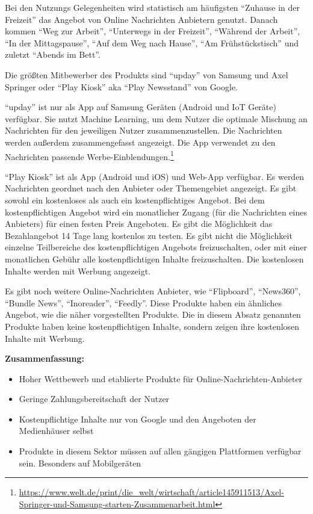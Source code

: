 Bei den Nutzungs Gelegenheiten wird statistisch am häufigsten \enquote{Zuhause in der Freizeit} das Angebot von Online Nachrichten Anbietern genutzt. Danach kommen \enquote{Weg zur Arbeit}, \enquote{Unterwegs in der Freizeit}, \enquote{Während der Arbeit}, \enquote{In der Mittagspause}, \enquote{Auf dem Weg nach Hause}, \enquote{Am Frühstückstisch} und zuletzt \enquote{Abends im Bett}.

Die größten Mitbewerber des Produkts sind \enquote{upday} von Samsung und Axel Springer oder \enquote{Play Kiosk} aka \enquote{Play Newsstand} von Google.

\enquote{upday} ist nur als App auf Samsung Geräten (Android und IoT Geräte) verfügbar. Sie nutzt Machine Learning, um dem Nutzer die optimale Mischung an Nachrichten für den jeweiligen Nutzer zusammenzustellen. Die Nachrichten werden außerdem zusammengefasst angezeigt. Die App verwendet zu den Nachrichten passende Werbe-Einblendungen.\footnote{\url{https://www.welt.de/print/die_welt/wirtschaft/article145911513/Axel-Springer-und-Samsung-starten-Zusammenarbeit.html}}

\enquote{Play Kiosk} ist als App (Android und iOS) und Web-App verfügbar. Es werden Nachrichten geordnet nach den Anbieter oder Themengebiet angezeigt. Es gibt sowohl ein kostenloses als auch ein kostenpflichtiges Angebot. Bei dem kostenpflichtigen Angebot wird ein monatlicher Zugang (für die Nachrichten eines Anbieters) für einen festen Preis Angeboten. Es gibt die Möglichkeit das Bezahlangebot 14 Tage lang kostenlos zu testen. Es gibt nicht die Möglichkeit einzelne Teilbereiche des kostenpflichtigen Angebots freizuschalten, oder mit einer monatlichen Gebühr alle kostenpflichtigen Inhalte freizuschalten. Die kostenlosen Inhalte werden mit Werbung angezeigt.

Es gibt noch weitere Online-Nachrichten Anbieter, wie \enquote{Flipboard}, \enquote{News360}, \enquote{Bundle News}, \enquote{Inoreader}, \enquote{Feedly}. Diese Produkte haben ein ähnliches Angebot, wie die näher vorgestellten Produkte. Die in diesem Absatz genannten Produkte haben keine kostenpflichtigen Inhalte, sondern zeigen ihre kostenlosen Inhalte mit Werbung.

\textbf{Zusammenfassung:}

\begin{itemize}
  \item Hoher Wettbewerb und etablierte Produkte für Online-Nachrichten-Anbieter
  \item Geringe Zahlungsbereitschaft der Nutzer
  \item Kostenpflichtige Inhalte nur von Google und den Angeboten der Medienhäuser selbst
  \item Produkte in diesem Sektor müssen auf allen gängigen Plattformen verfügbar sein. Besonders auf Mobilgeräten
\end{itemize}

